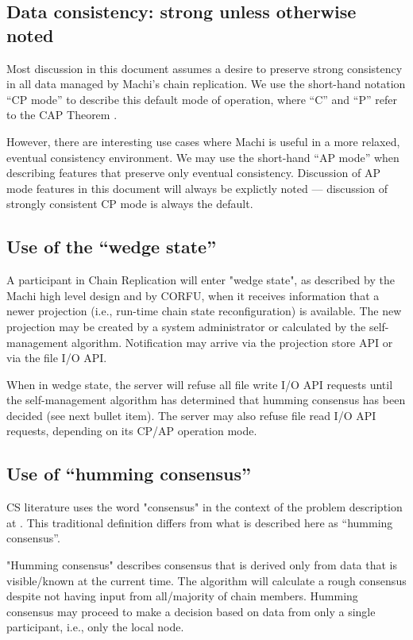 \documentclass[preprint,10pt]{sigplanconf}
\begin{document}
\subsection{Data consistency: strong unless otherwise noted}

Most discussion in this document assumes a desire to preserve strong
consistency in all data managed by Machi's chain replication.  We
use the short-hand notation ``CP mode'' to describe this default mode
of operation, where ``C'' and ``P'' refer to the CAP Theorem
\cite{cap-theorem}.

However, there are interesting use cases where Machi is useful in a
more relaxed, eventual consistency environment.  We may use the
short-hand ``AP mode'' when describing features that preserve only
eventual consistency.  Discussion of AP mode features in this document
will always be explictly noted --- discussion of strongly consistent CP
mode is always the default.

\subsection{Use of the ``wedge state''}

A participant in Chain Replication will enter "wedge state", as
described by the Machi high level design \cite{machi-design} and by CORFU,
when it receives information that
a newer projection (i.e., run-time chain state reconfiguration) is
available.  The new projection may be created by a system
administrator or calculated by the self-management algorithm.
Notification may arrive via the projection store API or via the file
I/O API.

When in wedge state, the server will refuse all file write I/O API
requests until the self-management algorithm has determined that
humming consensus has been decided (see next bullet item).  The server
may also refuse file read I/O API requests, depending on its CP/AP
operation mode.

\subsection{Use of ``humming consensus''}

CS literature uses the word "consensus" in the context of the problem
description at \cite{wikipedia-consensus}
.
This traditional definition differs from what is described here as
``humming consensus''.

"Humming consensus" describes
consensus that is derived only from data that is visible/known at the current
time.
The algorithm will calculate
a rough consensus despite not having input from all/majority
of chain members.  Humming consensus may proceed to make a
decision based on data from only a single participant, i.e., only the local
node.
\end{document}
